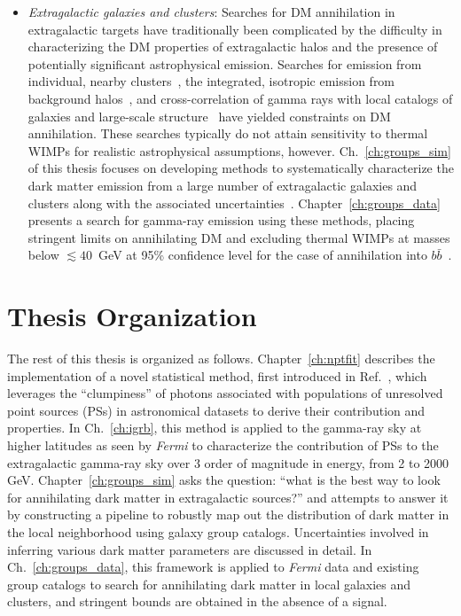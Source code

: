 \begin{itemize}
\item \emph{Extragalactic galaxies and clusters}: Searches for DM annihilation in extragalactic targets have traditionally been complicated by the difficulty in characterizing the DM properties of extragalactic halos and the presence of potentially significant astrophysical emission. Searches for emission from individual, nearby clusters~\cite{Ackermann:2015fdi}, the integrated, isotropic emission from background halos~\cite{Ackermann:2015tah,Ajello:2015mfa,Cholis:2013ena,DiMauro:2015tfa}, and cross-correlation of gamma rays with local catalogs of galaxies and large-scale structure~\cite{Ando:2013xwa,Ando:2014aoa,Ando:2016ang,Cuoco:2015rfa,Regis:2015zka,Xia:2015wka} have yielded constraints on DM annihilation. These searches typically do not attain sensitivity to thermal WIMPs for realistic astrophysical assumptions, however. Ch.~\ref{ch:groups_sim} of this thesis focuses on developing methods to systematically characterize the dark matter emission from a large number of extragalactic galaxies and clusters along with the associated uncertainties~\cite{Lisanti:2017qoz}. Chapter~\ref{ch:groups_data} presents a search for gamma-ray emission using these methods, placing stringent limits on annihilating DM and excluding thermal WIMPs at masses below $\lesssim 40$~GeV at 95\% confidence level for the case of annihilation into $b\bar b$~\cite{Lisanti:2017qlb}. 
\end{itemize}

\section{Thesis Organization}
\label{sec:summary}

The rest of this thesis is organized as follows. Chapter~\ref{ch:nptfit} describes the implementation of a novel statistical method, first introduced in Ref.~\cite{Lee:2015fea}, which leverages the ``clumpiness'' of photons associated with populations of unresolved point sources (PSs) in astronomical datasets to derive their contribution and properties. In Ch.~\ref{ch:igrb}, this method is applied to the gamma-ray sky at higher latitudes as seen by \emph{Fermi} to characterize the contribution of PSs to the extragalactic gamma-ray sky over 3 order of magnitude in energy, from 2 to 2000 GeV. Chapter~\ref{ch:groups_sim} asks the question: ``what is the best way to look for annihilating dark matter in extragalactic sources?'' and attempts to answer it by constructing a pipeline to robustly map out the distribution of dark matter in the local neighborhood using galaxy group catalogs. Uncertainties involved in inferring various dark matter parameters are discussed in detail. In Ch.~\ref{ch:groups_data}, this framework is applied to \emph{Fermi} data and existing group catalogs to search for annihilating dark matter in local galaxies and clusters, and stringent bounds are obtained in the absence of a signal. 


